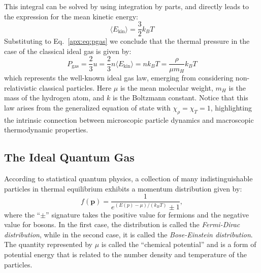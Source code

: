 \documentclass[main.tex]{subfiles}
\begin{document}
This integral can be solved by using integration by parts, and directly leads to the expression for the mean kinetic energy:
\begin{equation*}
    \langle E_\mathrm{kin} \rangle = \frac{3}{2}k_BT
\end{equation*}
Substituting to Eq.~\eqref{apx:eq:pgas} we conclude that the thermal pressure in the case of the classical ideal gas is given by:
\begin{equation}
    \boxed{P_{\text{gas}} = \frac{2}{3}u = \frac{2}{3} n \langle E_{\text{kin}} \rangle = nk_BT = \frac{\rho}{\mu m_H}k_BT}
\end{equation}
which represents the well-known ideal gas law, emerging from considering non-relativistic classical particles. Here $\mu$ is the mean molecular weight, $m_H$ is the mass of the hydrogen atom, and $k$ is the Boltzmann constant.
Notice that this law arises from the generalized equation of state with $\chi_\rho = \chi_T = 1$, highlighting the intrinsic connection between microscopic particle dynamics and macroscopic thermodynamic properties.



\subsection{The Ideal Quantum Gas}

According to statistical quantum physics, a collection of many indistinguishable particles in thermal equilibrium exhibits a momentum distribution given by:
    \begin{equation}
    f(\boldsymbol{p}) = \frac{1}{e^{(E(p) - \mu) / (k_B T)} \pm 1},
    \end{equation}
where the ``$\pm$'' signature takes the positive value for fermions and the negative value for bosons. In the first case, the distribution is called the \textit{Fermi-Dirac distribution}, while in the second case, it is called the \textit{Bose-Einstein distribution}. The quantity represented by $\mu$ is called the ``chemical potential'' and is a form of potential energy that is related to the number density and temperature of the particles.
\end{document}

